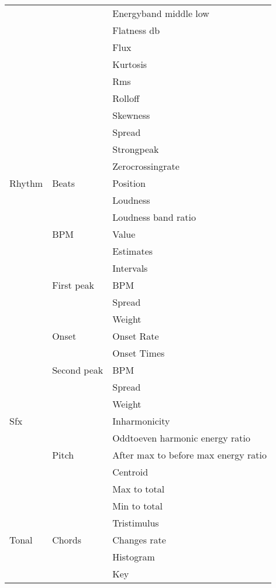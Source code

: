 \begin{center}
\begin{longtable}{ p{} p{} p{} }
& & Energyband middle low \\ \cmidrule(r){3-3}
& & Flatness db \\ \cmidrule(r){3-3}
& & Flux \\ \cmidrule(r){3-3}
& & Kurtosis \\ \cmidrule(r){3-3}
& & Rms \\ \cmidrule(r){3-3}
& & Rolloff \\ \cmidrule(r){3-3}
& & Skewness \\ \cmidrule(r){3-3}
& & Spread \\ \cmidrule(r){3-3}
& & Strongpeak \\ \cmidrule(r){2-3}
& & Zerocrossingrate \\ \midrule
Rhythm & Beats & Position \\ \cmidrule(r){3-3}
& & Loudness \\ \cmidrule(r){3-3}
& & Loudness band ratio \\ \cmidrule(r){2-3}
& BPM & Value \\ \cmidrule(r){3-3}
& & Estimates \\ \cmidrule(r){3-3}
& & Intervals \\ \cmidrule(r){2-3}
& First peak & BPM \\ \cmidrule(r){3-3}
& & Spread \\ \cmidrule(r){3-3}
& & Weight \\ \cmidrule(r){2-3}
& Onset & Onset Rate \\ \cmidrule(r){3-3}
& & Onset Times \\ \cmidrule(r){2-3}
& Second peak & BPM \\ \cmidrule(r){3-3}
& & Spread \\ \cmidrule(r){3-3}
& & Weight \\ \midrule
Sfx & & Inharmonicity \\ \cmidrule(r){2-3}
& & Oddtoeven harmonic energy ratio \\ \cmidrule(r){2-3}
& Pitch & After max to before max energy ratio \\ \cmidrule(r){3-3}
& & Centroid \\ \cmidrule(r){3-3}
& & Max to total \\ \cmidrule(r){3-3}
& & Min to total \\ \cmidrule(r){2-3}
& & Tristimulus \\ \midrule
Tonal & Chords & Changes rate \\ \cmidrule(r){3-3}
& & Histogram \\ \cmidrule(r){3-3}
& & Key \\ \cmidrule(r){3-3}

\end{longtable}
\end{center}
